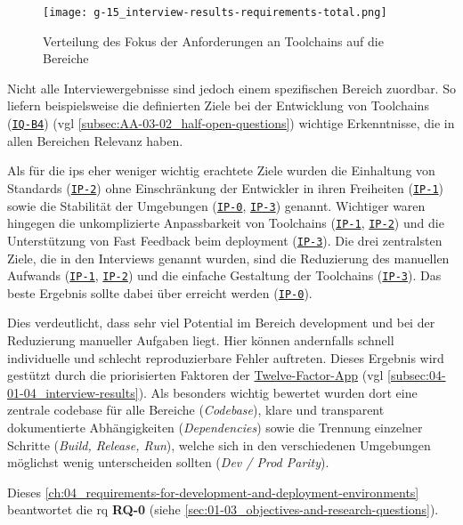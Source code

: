 \begin{figure}[h]
    \centering
    \texttt{[image: g-15\_interview-results-requirements-total.png]}
    \caption{Verteilung des Fokus der Anforderungen an Toolchains auf die Bereiche}
    \label{fig:g-15_interview-results-requirements-total}
\end{figure}

Nicht alle Interviewergebnisse sind jedoch einem spezifischen Bereich zuordbar. So liefern beispielsweise die definierten Ziele bei der Entwicklung von Toolchains (\texttt{\hyperref[subsec:AA-01-02_half-open-questions]{IQ-B4}}) (\acrshort{vgl} \autoref{subsec:AA-03-02_half-open-questions}) wichtige Erkenntnisse, die in allen Bereichen Relevanz haben.

Als für die \Glspl{ip} eher weniger wichtig erachtete Ziele wurden die Einhaltung von Standards (\texttt{\hyperref[sec:AA-02_interview-persons]{IP-2}}) ohne Einschränkung der Entwickler in ihren Freiheiten (\texttt{\hyperref[sec:AA-02_interview-persons]{IP-1}}) sowie die Stabilität der Umgebungen (\texttt{\hyperref[sec:AA-02_interview-persons]{IP-0}}, \texttt{{\hyperref[sec:AA-02_interview-persons]{IP-3}}}) genannt. Wichtiger waren hingegen die unkomplizierte Anpassbarkeit von Toolchains (\texttt{\hyperref[sec:AA-02_interview-persons]{IP-1}}, \texttt{\hyperref[sec:AA-02_interview-persons]{IP-2}}) und die Unterstützung von Fast Feedback beim \Gls{deployment} (\texttt{\hyperref[sec:AA-02_interview-persons]{IP-3}}). Die drei zentralsten Ziele, die in den Interviews genannt wurden, sind die Reduzierung des manuellen Aufwands (\texttt{\hyperref[sec:AA-02_interview-persons]{IP-1}}, \texttt{\hyperref[sec:AA-02_interview-persons]{IP-2}}) und die einfache Gestaltung der Toolchains (\texttt{\hyperref[sec:AA-02_interview-persons]{IP-3}}). Das beste Ergebnis sollte dabei über  erreicht werden (\texttt{\hyperref[sec:AA-02_interview-persons]{IP-0}}).

Dies verdeutlicht, dass sehr viel Potential im Bereich \Gls{development} und bei der Reduzierung manueller Aufgaben liegt. Hier können andernfalls schnell individuelle und schlecht reproduzierbare Fehler auftreten. Dieses Ergebnis wird gestützt durch die priorisierten Faktoren der \hyperref[sec:03-05_concept-of-twelve-factor-app]{Twelve-Factor-App} (\acrshort{vgl} \autoref{subsec:04-01-04_interview-results}). Als besonders wichtig bewertet wurden dort eine zentrale \Gls{codebase} für alle Bereiche (\textit{Codebase}), klare und transparent dokumentierte Abhängigkeiten (\textit{Dependencies}) sowie die Trennung einzelner Schritte (\textit{Build, Release, Run}), welche sich in den verschiedenen Umgebungen möglichst wenig unterscheiden sollten (\textit{Dev / Prod Parity}).

Dieses \autoref{ch:04_requirements-for-development-and-deployment-environments} beantwortet die \acrlong{rq} \textbf{RQ-0} (siehe \autoref{sec:01-03_objectives-and-research-questions}).
